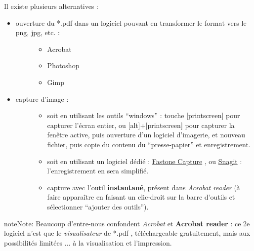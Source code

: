 \documentclass[a4paper,12pt,french]{sphinxmanual}
\begin{document}
Il existe plusieurs alternatives :
\begin{itemize}
\item {} \begin{description}
\item[{ouverture du *.pdf dans un logiciel pouvant en transformer le format vers le png, jpg, etc. :}] \leavevmode\begin{itemize}
\item {} 
Acrobat

\item {} 
Photoshop

\item {} 
Gimp

\end{itemize}

\end{description}

\item {} \begin{description}
\item[{capture d'image :}] \leavevmode\begin{itemize}
\item {} 
soit en utilisant les outils ``windows'' : touche {[}printscreen{]} pour capturer l'écran entier, ou {[}alt{]}+{[}printscreen{]} pour capturer la fenêtre active, puis ouverture d'un logiciel d'imagerie, et nouveau fichier, puis copie du contenu du ``presse-papier'' et enregistrement.

\item {} 
soit en utilisant un logiciel dédié : \href{http://www.faststone.org/FSCaptureDetail.htm}{Fastone Capture} , ou \href{http://www.techsmith.fr/snagit.asp}{Snagit} : l'enregistrement en sera simplifié.

\item {} 
capture avec l'outil \textbf{instantané}, présent dans \emph{Acrobat reader} (à faire apparaître en faisant un clic-droit sur la barre d'outils et sélectionner ``ajouter des outils'').

\end{itemize}

\end{description}

\end{itemize}

\begin{notice}{note}{Note:}
Beaucoup d'entre-nous confondent \emph{Acrobat} et \textbf{Acrobat reader} : ce 2e logiciel n'est que le \emph{visualisateur} de *.pdf , téléchargeable gratuitement, mais aux possibilités limitées ... à la visualisation et l'impression.
\end{notice}
\end{document}
